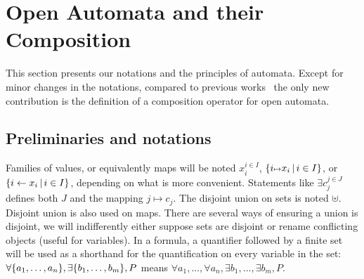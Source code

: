 \documentclass[runningheads]{llncs}
\begin{document}
\section{Open Automata and their Composition}\label{sec:background}

This section presents our notations and the principles of automata. Except for minor changes in the notations, compared to previous works~\cite{fhbisim} the only new contribution is the definition of a composition operator for open automata.
%



\subsection{Preliminaries and notations}
Families of values, or equivalently maps will be noted \(x_i^{i \in I}\), \(\mset{i \mapsto x_i}{i \in I}\), or \({\left\{i \gets x_i\,\middle|\, i \in I\right\}}\), depending on what is more convenient. Statements like  $\exists c_j^{j \in J}$ defines both $J$ and the mapping ${j \mapsto c_j}$.
The disjoint union on sets is noted \(\uplus\).
Disjoint union is also used on maps.
There are several ways of ensuring a union is disjoint, we will indifferently either suppose sets are disjoint or rename conflicting objects (useful for variables).
In a formula, a quantifier followed by a finite set will be used as a shorthand for the quantification on every variable in the set:
\(\forall {\left\{a_1, \dots, a_n\right\}}, \exists {\left\{b_1, \dots, b_m\right\}}, P\) means \(\forall a_1, \dots, \forall a_n, \exists b_1, \dots, \exists b_m, P\).
\end{document}

